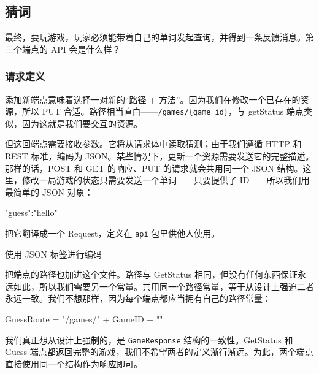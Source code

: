 \subsection{猜词}

最终，要玩游戏，玩家必须能带着自己的单词发起查询，并得到一条反馈消息。第三个端点的 API 会是什么样？

\subsubsection*{请求定义}

添加新端点意味着选择一对新的``路径 + 方法''。因为我们在修改一个已存在的资源，所以 PUT 合适。路径相当直白——\texttt{/games/\{game\_id\}}，与 getStatus 端点类似，因为这就是我们要交互的资源。

但这回端点需要接收参数。它将从请求体中读取猜测；由于我们遵循 HTTP 和 REST 标准，编码为 JSON。某些情况下，更新一个资源需要发送它的完整描述。那样的话，POST 和 GET 的响应、PUT 的请求就会共用同一个 JSON 结构。这里，修改一局游戏的状态只需要发送一个单词——只要提供了 ID——所以我们用最简单的 JSON 对象：

\begin{gocode}[]
{"guess":"hello"}
\end{gocode}

把它翻译成一个 Request，定义在 \texttt{api} 包里供他人使用。


\begin{codeannotations}
\item 使用 JSON 标签进行编码
\end{codeannotations}

把端点的路径也加进这个文件。路径与 GetStatus 相同，但没有任何东西保证永远如此，所以我们需要另一个常量。共用同一个路径常量，等于从设计上强迫二者永远一致。我们不想那样，因为每个端点都应当拥有自己的路径常量：

\begin{gocode}[]
GuessRoute = "/games/{" + GameID + "}"
\end{gocode}

我们真正想从设计上强制的，是 \texttt{GameResponse} 结构的一致性。GetStatus 和 Guess 端点都返回完整的游戏，我们不希望两者的定义渐行渐远。为此，两个端点直接使用同一个结构作为响应即可。

